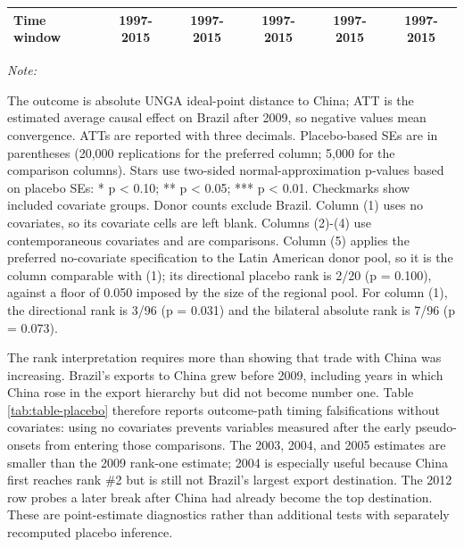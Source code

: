 \documentclass[
  12pt,
]{article}
\begin{document}
\begin{table}[H]
{\begin{threeparttable}
\begin{tabular}[t]{lccccc}
Time window & 1997-2015 & 1997-2015 & 1997-2015 & 1997-2015 & 1997-2015\\
\bottomrule
\end{tabular}
\begin{tablenotes}
\item \textit{Note: } 
\item The outcome is absolute UNGA ideal-point distance to China; ATT is the estimated average causal effect on Brazil after 2009, so negative values mean convergence. ATTs are reported with three decimals. Placebo-based SEs are in parentheses (20,000 replications for the preferred column; 5,000 for the comparison columns). Stars use two-sided normal-approximation p-values based on placebo SEs: * p < 0.10; ** p < 0.05; *** p < 0.01. Checkmarks show included covariate groups. Donor counts exclude Brazil. Column (1) uses no covariates, so its covariate cells are left blank. Columns (2)-(4) use contemporaneous covariates and are comparisons. Column (5) applies the preferred no-covariate specification to the Latin American donor pool, so it is the column comparable with (1); its directional placebo rank is 2/20 (p = 0.100), against a floor of 0.050 imposed by the size of the regional pool. For column (1), the directional rank is 3/96 (p = 0.031) and the bilateral absolute rank is 7/96 (p = 0.073).
\end{tablenotes}
\end{threeparttable}}
\end{table}

The rank interpretation requires more than showing that trade with China was increasing. Brazil's exports to China grew before 2009, including years in which China rose in the export hierarchy but did not become number one. Table \ref{tab:table-placebo} therefore reports outcome-path timing falsifications without covariates: using no covariates prevents variables measured after the early pseudo-onsets from entering those comparisons. The 2003, 2004, and 2005 estimates are smaller than the 2009 rank-one estimate; 2004 is especially useful because China first reaches rank \#2 but is still not Brazil's largest export destination. The 2012 row probes a later break after China had already become the top destination. These are point-estimate diagnostics rather than additional tests with separately recomputed placebo inference.
\end{document}
